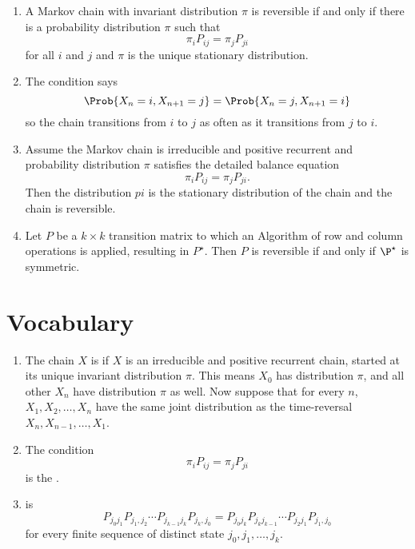 \documentclass[12pt]{article}
\begin{document}
\begin{enumerate}
  \item   A Markov chain with invariant distribution $\pi$ is reversible if
  and only if there is a probability distribution $\pi$ such that
  \[
    \pi_i P_{ij} = \pi_j P_{ji}
  \]
  for all $i$ and $j$ and $\pi$ is the unique stationary distribution.
  \item   The condition says
  \[
    \Prob{X_n =i, X_{n+1} = j} = \Prob{X_n =j, X_{n+1} = i}
  \]
  so the chain transitions from $i$ to $j$ as often as it transitions
  from $j$ to $i$.
  \item   Assume the Markov chain is irreducible and positive recurrent and
  probability distribution $\pi$ satisfies the detailed balance equation
  \[
    \pi_i P_{ij} = \pi_j P_{ji}.
  \]
  Then the distribution $pi$ is the stationary distribution of the chain
  and the chain is reversible.
\item   Let $P$ be a $k \times k$ transition matrix to which an
  Algorithm of row and column operations
  is applied, resulting in $P^{\star}$.  Then $P$ is reversible if and
  only if $\P^{\star}$ is symmetric.
  \end{enumerate}

\hr

\section*{Vocabulary}
\begin{enumerate}
  \item  The chain $X$ is  if  $X$ is an irreducible and positive recurrent chain, started at its unique invariant
distribution $\pi$.  This means  $X_0$ has distribution
$\pi$, and all other $X_n$ have distribution $\pi$ as well.
Now suppose that for every $n$, $X_1, X_2, \dots , X_n$ have the same joint distribution as the time-reversal
$X_n, X_{n-1}, \dots , X_1$.
\item   The condition
  \[
    \pi_i P_{ij} = \pi_j P_{ji}
  \]
  is the .
\item  {} is
  \[
  P_{j_0 j_1} P_{j_1,j_2} \cdots P_{j_{k-1} j_k} P_{j_k, j_0} =
  P_{j_0 j_k} P_{j_k j_{k-1}} \cdots P_{j_2 j_1} P_{j_1, j_0}
\]
for every finite sequence of distinct state $j_0, j_1, \dots, j_k$.
\end{enumerate}
\end{document}
